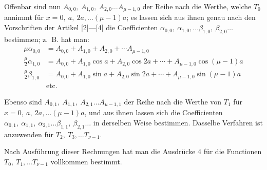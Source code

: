 \begin{landscape}
\par\noindent\hspace*{\parindent}Offenbar sind nun \(A_{0,0},\ A_{1,0},\ A_{2,0}\ldots A_{\mu-1,0}\) der Reihe nach die Werthe, welche \(T_0\) annimmt für \(x=0,\ a,\ 2a,\ldots(\mu-1)a\); es lassen sich aus ihnen genau nach den Vorschriften der Artikel [2]---[4] die Coefficienten \(\alpha_{0,0},\ \alpha_{1,0},\ldots\beta_{1,0},\ \beta_{2,0}\ldots\) bestimmen; z.~B. hat man:
\[
\begin{aligned}
\mu\alpha_{0,0}&=A_{0,0}+A_{1,0}+A_{2,0}+\cdots A_{\mu-1,0}\\[4pt]
\frac\mu2\alpha_{1,0}&=A_{0,0}+A_{1,0}\cos a+A_{2,0}\cos2a+\cdots+A_{\mu-1,0}\cos(\mu-1)a\\[4pt]
\frac\mu2\beta_{1,0}&=A_{0,0}+A_{1,0}\sin a+A_{2,0}\sin2a+\cdots+A_{\mu-1,0}\sin(\mu-1)a\\
 &\text{etc.}
\end{aligned}
\]

\par\noindent\hspace*{\parindent}Ebenso sind \(A_{0,1},\ A_{1,1},\ A_{2,1}\ldots A_{\mu-1,1}\) der Reihe nach die Werthe von \(T_1\) für \(x=0,\ a,\ 2a,\ldots(\mu-1)a\), und aus ihnen lassen sich die Coefficienten \(\alpha_{0,1},\ \alpha_{1,1},\ \alpha_{2,1}\ldots\beta_{1,1},\ \beta_{2,1}\ldots\) in derselben Weise bestimmen. Dasselbe Verfahren ist anzuwenden für \(T_2,\ T_3,\ldots T_{\nu-1}\).

\par\noindent\hspace*{\parindent}Nach Ausführung dieser Rechnungen hat man die Ausdrücke 4 für die Functionen \(T_0,\ T_1,\ldots T_{\nu-1}\) vollkommen bestimmt.


\end{landscape}
